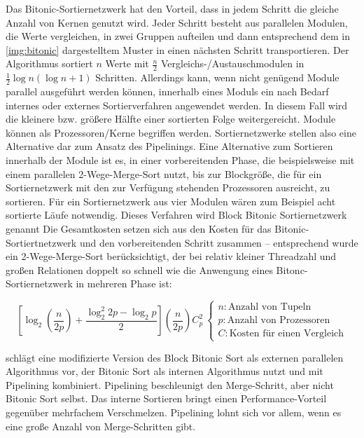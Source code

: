 \documentclass[a4paper,12pt,twoside]{article}
\begin{document}
{Das Bitonic-Sortiernetzwerk \parencite[S. 335f]{Bitton1983} hat den Vorteil, dass in jedem Schritt die gleiche Anzahl von Kernen genutzt wird. Jeder Schritt besteht aus parallelen Modulen, die Werte vergleichen, in zwei Gruppen aufteilen und dann entsprechend dem in \autoref{img:bitonic} dargestelltem Muster in einen nächsten Schritt transportieren. Der Algorithmus sortiert $n$ Werte mit $\frac {n} {2} $ Vergleichs-/Austauschmodulen in $\frac{1}{2} \log n (\log n +1)$ Schritten. Allerdings kann, wenn nicht genügend Module parallel ausgeführt werden können, innerhalb eines Moduls ein nach Bedarf internes oder externes Sortierverfahren angewendet werden. In diesem Fall wird die kleinere bzw. größere Hälfte einer sortierten Folge weitergereicht. Module können als Prozessoren/Kerne begriffen werden. Sortiernetzwerke stellen also eine Alternative dar zum Ansatz des Pipelinings. Eine Alternative zum Sortieren innerhalb der Module ist es, in einer vorbereitenden Phase, die beispielsweise mit einem parallelen 2-Wege-Merge-Sort nutzt, bis zur Blockgröße, die für ein Sortiernetzwerk mit den zur Verfügung stehenden Prozessoren ausreicht, zu sortieren. Für ein Sortiernetzwerk aus vier Modulen wären zum Beispiel acht sortierte Läufe notwendig. Dieses Verfahren wird Block Bitonic Sortiernetzwerk genannt \parencite[S. 335]{Bitton1983}  Die Gesamtkosten setzen sich aus den Kosten für das Bitonic-Sortiertnetzwerk und den vorbereitenden Schritt zusammen -- entsprechend \textcite[S. 335]{Bitton1983} wurde ein 2-Wege-Merge-Sort berücksichtigt, der bei relativ kleiner Threadzahl und großen Relationen doppelt so schnell wie die Anwengung eines Bitonc-Sortiernetzwerk in mehreren Phase ist:

\[
\left[ \log _2 (\frac {n} {2 p}) + \frac {\log _2 ^2 2 p - \log _2 p} {2} \right] ( \frac {n}{2 p}) C _{p} ^{2}\:
\begin{cases}
n: \text{Anzahl von Tupeln}\\
p: \text{Anzahl von Prozessoren}\\
C: \text{Kosten für einen Vergleich}
\end{cases}
\]

{\textcite{Menon1986}} schlägt eine modifizierte Version des Block Bitonic Sort als externen parallelen Algorithmus vor, der Bitonic Sort als internen Algorithmus nutzt und mit Pipelining kombiniert. Pipelining beschleunigt den Merge-Schritt, aber nicht Bitonic Sort selbst. Das interne Sortieren bringt einen Performance-Vorteil gegenüber mehrfachem Verschmelzen. Pipelining lohnt sich vor allem, wenn es eine große Anzahl von Merge-Schritten gibt.

}
\end{document}

